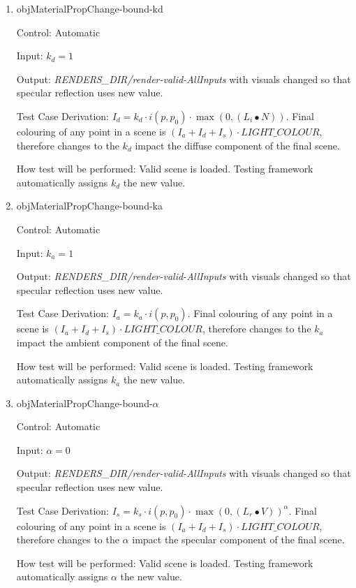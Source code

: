 \documentclass[12pt, titlepage]{article}
\begin{document}
\begin{enumerate}
	\item{objMaterialPropChange-bound-kd\\}
	
	Control: Automatic
	
	Input: $k_{d} = 1$
	
	Output: \textit{RENDERS\_DIR/render-valid-AllInputs} with visuals changed 
	so that specular reflection uses new value.
	
	Test Case Derivation: $I_{d} = k_{d}\cdot i(p,p_{0}) \cdot 
	\max(0,(L_{i}\bullet N))$. Final colouring of any point in a scene is 
	$(I_{a}+I_{d}+I_{s})\cdot LIGHT\_COLOUR$, therefore changes to the $k_{d}$ 
	impact the diffuse component of the final scene.
	
	How test will be performed: Valid scene is loaded. Testing framework 
	automatically assigns $k_{d}$ the new value. 	
	
	\item{objMaterialPropChange-bound-ka\\}
	
	Control: Automatic
	
	Input: $k_{a} = 1$
	
	Output: \textit{RENDERS\_DIR/render-valid-AllInputs} with visuals changed 
	so that specular reflection uses new value.
	
	Test Case Derivation: $I_{a} = k_{a}\cdot i(p,p_{0})$. Final colouring of 
	any point in a scene is $(I_{a}+I_{d}+I_{s})\cdot LIGHT\_COLOUR$, therefore 
	changes to the $k_{a}$ impact the ambient component of the final scene.
	
	How test will be performed: Valid scene is loaded. Testing framework 
	automatically assigns $k_{a}$ the new value. 
	
	\item{objMaterialPropChange-bound-$\alpha$\\}
	
	Control: Automatic
	
	Input: $\alpha = 0$
	
	Output: \textit{RENDERS\_DIR/render-valid-AllInputs} with visuals changed 
	so that specular reflection uses new value.
	
	Test Case Derivation: $I_{s} = k_{s}\cdot i(p,p_{0}) \cdot \max(0, 
	({L_{r}}\bullet V))^\alpha$. Final colouring of any point in a scene is 
	$(I_{a}+I_{d}+I_{s})\cdot LIGHT\_COLOUR$, therefore changes to the $\alpha$ 
	impact the specular component of the final scene.
	
	How test will be performed: Valid scene is loaded. Testing framework 
	automatically assigns $\alpha$ the new value.


\end{enumerate}
\end{document}
